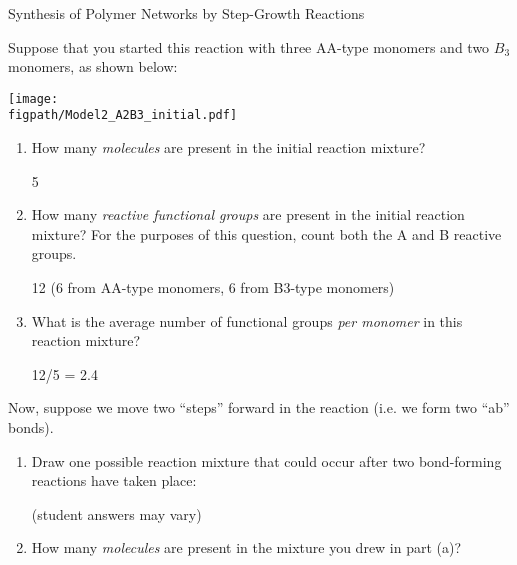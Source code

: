 \begin{activity}[extension]{Synthesis of Polymer Networks by Step-Growth Reactions}
\begin{ctqs}

	\question Suppose that you started this reaction with three AA-type monomers and two $B_3$ monomers, as shown below:
	
	\vspace{9pt}
		\centerline{\texttt{[image: \\figpath/Model2\_A2B3\_initial.pdf]}}
	
		\begin{enumerate}
			\item How many \emph{molecules} are present in the initial reaction mixture?
			
				\begin{solution}[0.5in]
					5
				\end{solution}
			
			\item How many \emph{reactive functional groups} are present in the initial reaction mixture?  For the purposes of this question, count both the A and B reactive groups.
			
				\begin{solution}[0.5in]
					12 (6 from AA-type monomers, 6 from B3-type monomers)
				\end{solution}
				
			\item What is the average number of functional groups \emph{per monomer} in this reaction mixture?
			
				\begin{solution}[0.5in]
					12/5 = 2.4
				\end{solution}
			
		\end{enumerate}
	
	\clearpage
	\question Now, suppose we move two ``steps'' forward in the reaction (i.e. we form two ``ab'' bonds).
	
		\begin{enumerate}
		
			\item Draw one possible reaction mixture that could occur after two bond-forming reactions have taken place:
			
				\begin{solution}[1.5in]
				
					(student answers may vary)
					
				\end{solution}
			\item How many \emph{molecules} are present in the mixture you drew in part (a)?
			

\end{enumerate}
\end{ctqs}
\end{activity}
